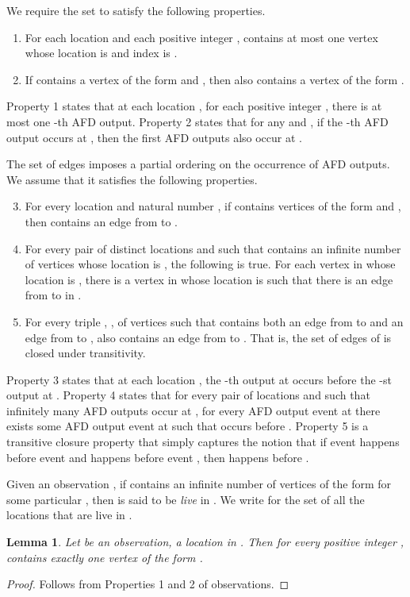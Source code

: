 \documentclass[11pt]{article}
\numberwithin{theorem}{section}
\newtheorem{lemma}[theorem]{Lemma}
\begin{document}
We require the set  to satisfy the following properties.
\begin{enumerate}
\item 
For each location  and each positive integer ,  contains at
most one vertex whose location is  and index is .
\item 
If  contains a vertex of the form  and , then 
also contains a vertex of the form .
\end{enumerate}
Property 1 states that at each location , for each positive integer , there is at most
one -th AFD output. 
Property 2 states that for any  and , if the -th AFD output occurs at ,
then the first  AFD outputs also occur at .

The set  of edges imposes a partial ordering on the occurrence of
AFD outputs.  We assume that it satisfies the following properties.
\begin{enumerate}
\setcounter{enumi}{2}
\item 
For every location  and natural number , if  contains
vertices of the form  and , then 
contains an edge from  to . 
\item 
For every pair of distinct locations  and  such that 
contains an infinite number of vertices whose location is , the
following is true. 
For each vertex  in  whose location is , there is a vertex
 in  whose location is  such that there is an edge from
 to  in .
\item 
For every triple , ,  of vertices such that 
contains both an edge from  to  and an edge from  to
,  also contains an edge from  to . 
That is, the set of edges of  is closed under transitivity.
\end{enumerate}
Property 3 states that at each location , the -th output at  occurs before the
-st output at . 
Property 4 states that for every pair of locations  and  such that infinitely many AFD outputs occur at , for every AFD output event  at  there exists some AFD output event  at  such that  occurs before
. 
Property 5 is a transitive closure property that simply captures the
notion that if event  happens before event  and 
happens before event , then  happens before .

Given an observation , if  contains an infinite number
of vertices of the form  for some particular , then  is
said to be \emph{live} in . 
We write  for the set of all the locations that are live in .

\begin{lemma}
\label{prop:liveImpliesAllIndices}
Let  be an observation,  a location in .
Then for every positive integer ,  contains exactly one vertex
of the form .
\end{lemma}
\begin{proof}
Follows from Properties 1 and 2 of observations.
\end{proof}
\end{document}
